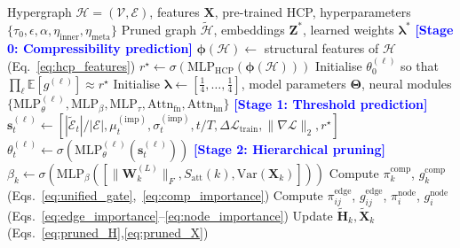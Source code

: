 \documentclass[10pt]{article}
\theoremstyle{plain}
\theoremstyle{definition}
\begin{document}
\begin{algorithm}[ht]
\caption{TriPrune-HGNN with Compressibility-Predicted Density
Curriculum}
\label{alg:tripruneframework}
\begin{algorithmic}[1]
\Require Hypergraph $\mathcal{H}=(\mathcal{V},\mathcal{E})$,
         features $\mathbf{X}$, pre-trained HCP, hyperparameters
         $\{\tau_0,\epsilon,\alpha,\eta_{\mathrm{inner}},
         \eta_{\mathrm{meta}}\}$
\Ensure  Pruned graph $\widetilde{\mathcal{H}}$, embeddings
         $\mathbf{Z}^*$, learned weights $\boldsymbol{\lambda}^*$
\State \textcolor{blue}{\textbf{[Stage 0: Compressibility prediction]}}
\State $\boldsymbol{\phi}(\mathcal{H}) \gets$
       structural features of $\mathcal{H}$
       (Eq.~\eqref{eq:hcp_features})
\State $r^\star \gets
       \sigma(\mathrm{MLP}_{\mathrm{HCP}}(\boldsymbol{\phi}(\mathcal{H})))$
\State Initialise $\theta_0^{(\ell)}$ so that
       $\prod_\ell\mathbb{E}[g^{(\ell)}]\approx r^\star$
\State Initialise
       $\boldsymbol{\lambda}\!\leftarrow\![\tfrac{1}{4},\dots,
       \tfrac{1}{4}]$, model parameters $\boldsymbol{\Theta}$,
       neural modules $\{\mathrm{MLP}_\theta^{(\ell)},
       \mathrm{MLP}_\beta, \mathrm{MLP}_\tau,
       \mathrm{Attn}_{\mathrm{fn}}, \mathrm{Attn}_{\mathrm{hn}}\}$
   \State \textcolor{blue}{\textbf{[Stage 1: Threshold prediction]}}
      \State $\mathbf{s}_t^{(\ell)}\!\gets\![|\widetilde{\mathcal{E}}_t|/|\mathcal{E}|,
             \mu_t^{(\mathrm{imp})},\sigma_t^{(\mathrm{imp})},
             t/T,\Delta\mathcal{L}_{\mathrm{train}},
             \|\nabla\mathcal{L}\|_2, r^\star]$
      \State $\theta_t^{(\ell)}\!\gets\!
             \sigma(\mathrm{MLP}_\theta^{(\ell)}(\mathbf{s}_t^{(\ell)}))$
   \EndFor
   \State \textcolor{blue}{\textbf{[Stage 2: Hierarchical pruning]}}
      \State $\beta_k\!\gets\!
             \sigma(\mathrm{MLP}_\beta([\|\mathbf{W}_k^{(L)}\|_F,
             S_{\mathrm{att}}(k),\mathrm{Var}(\mathbf{X}_k)]))$
      \State Compute $\pi_k^{\mathrm{comp}}$,
             $g_k^{\mathrm{comp}}$
             (Eqs.~\eqref{eq:unified_gate},~\eqref{eq:comp_importance})
         \State Compute $\pi_{ij}^{\mathrm{edge}}$,
                $g_{ij}^{\mathrm{edge}}$,
                $\pi_i^{\mathrm{node}}$, $g_i^{\mathrm{node}}$
                (Eqs.~\eqref{eq:edge_importance}--\eqref{eq:node_importance})
         \State Update $\widetilde{\mathbf{H}}_k,
                \widetilde{\mathbf{X}}_k$
                (Eqs.~\eqref{eq:pruned_H},\eqref{eq:pruned_X})

\end{algorithmic}
\end{algorithm}
\end{document}
